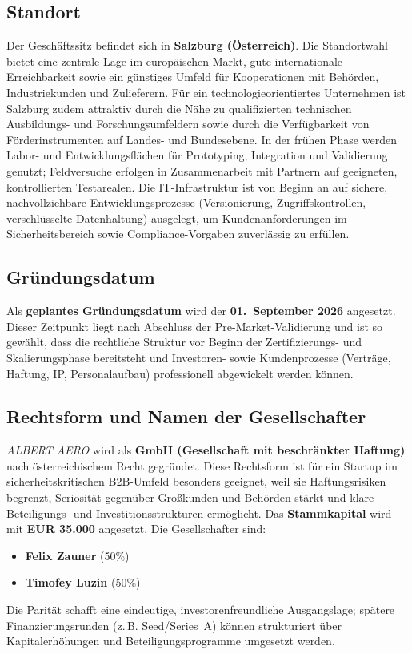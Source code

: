 \documentclass[11pt,a4paper]{article}
\begin{document}
\subsection{Standort}
Der Geschäftssitz befindet sich in \textbf{Salzburg (Österreich)}. Die Standortwahl bietet eine zentrale Lage im europäischen Markt, gute internationale Erreichbarkeit sowie ein günstiges Umfeld für Kooperationen mit Behörden, Industriekunden und Zulieferern. Für ein technologieorientiertes Unternehmen ist Salzburg zudem attraktiv durch die Nähe zu qualifizierten technischen Ausbildungs- und Forschungsumfeldern sowie durch die Verfügbarkeit von Förderinstrumenten auf Landes- und Bundesebene. In der frühen Phase werden Labor- und Entwicklungsflächen für Prototyping, Integration und Validierung genutzt; Feldversuche erfolgen in Zusammenarbeit mit Partnern auf geeigneten, kontrollierten Testarealen. Die IT-Infrastruktur ist von Beginn an auf sichere, nachvollziehbare Entwicklungsprozesse (Versionierung, Zugriffskontrollen, verschlüsselte Datenhaltung) ausgelegt, um Kundenanforderungen im Sicherheitsbereich sowie Compliance-Vorgaben zuverlässig zu erfüllen.

\subsection{Gründungsdatum}
Als \textbf{geplantes Gründungsdatum} wird der \textbf{01.\ September 2026} angesetzt. Dieser Zeitpunkt liegt nach Abschluss der Pre-Market-Validierung und ist so gewählt, dass die rechtliche Struktur vor Beginn der Zertifizierungs- und Skalierungsphase bereitsteht und Investoren- sowie Kundenprozesse (Verträge, Haftung, IP, Personalaufbau) professionell abgewickelt werden können.

\subsection{Rechtsform und Namen der Gesellschafter}
\textit{ALBERT AERO} wird als \textbf{GmbH (Gesellschaft mit beschränkter Haftung)} nach österreichischem Recht gegründet. Diese Rechtsform ist für ein Startup im sicherheitskritischen B2B-Umfeld besonders geeignet, weil sie Haftungsrisiken begrenzt, Seriosität gegenüber Großkunden und Behörden stärkt und klare Beteiligungs- und Investitionsstrukturen ermöglicht. Das \textbf{Stammkapital} wird mit \textbf{EUR 35.000} angesetzt. Die Gesellschafter sind:
\begin{itemize}
  \item \textbf{Felix Zauner} (50\%)
  \item \textbf{Timofey Luzin} (50\%)
\end{itemize}
Die Parität schafft eine eindeutige, investorenfreundliche Ausgangslage; spätere Finanzierungsrunden (z.\,B. Seed/Series~A) können strukturiert über Kapitalerhöhungen und Beteiligungsprogramme umgesetzt werden.
\end{document}

